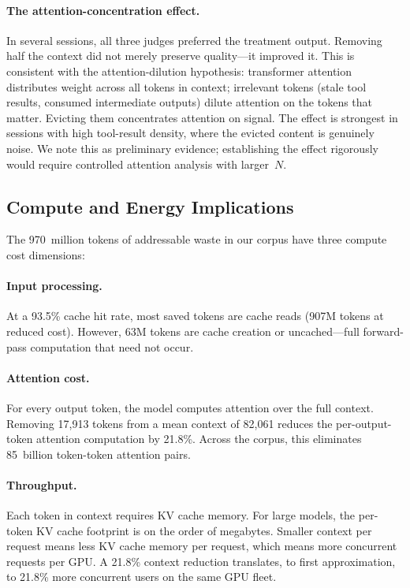 \paragraph{The attention-concentration effect.}
In several sessions, all three judges preferred the treatment output.
Removing half the context did not merely preserve quality---it
improved it. This is consistent with the attention-dilution hypothesis:
transformer attention distributes weight across all tokens in context;
irrelevant tokens (stale tool results, consumed intermediate outputs)
dilute attention on the tokens that matter. Evicting them concentrates
attention on signal. The effect is strongest in sessions with high
tool-result density, where the evicted content is genuinely noise.
We note this as preliminary evidence; establishing the effect
rigorously would require controlled attention analysis with larger~$N$.

\subsection{Compute and Energy Implications}
\label{sec:energy}

The 970~million tokens of addressable waste in our corpus have
three compute cost dimensions:

\paragraph{Input processing.}
At a 93.5\% cache hit rate, most saved tokens are cache reads
(907M tokens at reduced cost). However, 63M tokens are cache
creation or uncached---full forward-pass computation that need not
occur.

\paragraph{Attention cost.}
For every output token, the model computes attention over the full
context. Removing 17{,}913 tokens from a mean context of 82{,}061
reduces the per-output-token attention computation by 21.8\%.
Across the corpus, this eliminates 85~billion token-token attention
pairs.

\paragraph{Throughput.}
Each token in context requires KV cache memory. For large models,
the per-token KV cache footprint is on the order of megabytes.
Smaller context per request means less KV cache memory per request,
which means more concurrent requests per GPU. A 21.8\% context
reduction translates, to first approximation, to 21.8\% more
concurrent users on the same GPU fleet.

